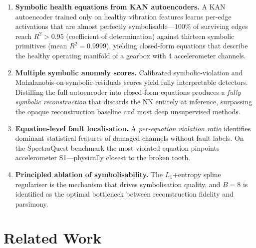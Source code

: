 \documentclass[conference]{IEEEtran}
\begin{document}
\begin{enumerate}
\item \textbf{Symbolic health equations from KAN autoencoders.}
A KAN autoencoder trained only on healthy vibration features learns
per-edge activations that are almost perfectly symbolisable---$100\%$
of surviving edges reach $R^2{>}0.95$ (coefficient of determination) against thirteen symbolic primitives
(mean $R^2{=}0.9999$), yielding closed-form equations that describe
the healthy operating manifold of a gearbox with 4 accelerometer channels.

\item \textbf{Multiple symbolic anomaly scores.}
Calibrated symbolic-violation and Mahalanobis-on-symbolic-residuals
scores yield fully interpretable detectors. Distilling the full
autoencoder into closed-form equations produces a \emph{fully symbolic
reconstruction} that discards the NN entirely at inference,
surpassing the opaque reconstruction baseline and most deep unsupervised methods.

\item \textbf{Equation-level fault localisation.}
A \emph{per-equation violation ratio} identifies dominant statistical
features of damaged channels without fault labels. On the SpectraQuest
benchmark the most violated equation pinpoints accelerometer S1---physically
closest to the broken tooth.

\item \textbf{Principled ablation of symbolisability.}
The $L_1$+entropy spline regulariser is the mechanism that drives
symbolisation quality, and $B{=}8$ is identified as the optimal
bottleneck between reconstruction fidelity and parsimony.
\end{enumerate}


\section{Related Work}
\label{sec:related}
\end{document}
